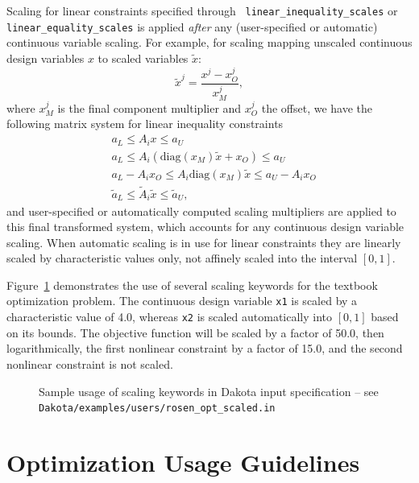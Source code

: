 Scaling for linear constraints specified through {\tt
linear\_inequality\_scales} or {\tt linear\_equality\_scales} is
applied {\em after} any (user-specified or automatic) continuous
variable scaling. For example, for scaling mapping unscaled
continuous design variables $x$ to scaled variables $\tilde{x}$:
\[ \tilde{x}^j = \frac{x^j - x^j_O}{x^j_M}, \]
where $x^j_M$ is the final component multiplier and $x^j_O$ the
offset, we have the following matrix system for linear inequality
constraints
\begin{eqnarray*}
& a_L \leq A_i x \leq a_U \\
& a_L \leq A_i \left( \mathrm{diag}(x_M) \tilde{x} + x_O \right) \leq a_U \\
& a_L - A_i x_O \leq A_i \mathrm{diag}(x_M) \tilde{x} \leq a_U - A_i x_O \\
& \tilde{a}_L \leq \tilde{A}_i \tilde{x} \leq \tilde{a}_U,
\end{eqnarray*}
and user-specified or automatically computed scaling multipliers are
applied to this final transformed system, which accounts for any
continuous design variable scaling. When automatic scaling is in use
for linear constraints they are linearly scaled by characteristic
values only, not affinely scaled into the interval $[0,1]$.

Figure~\ref{opt:additional:scaling:figure01} demonstrates the use of
several scaling keywords for the textbook optimization problem.
The continuous design variable {\tt x1} is scaled by a characteristic
value of 4.0, whereas {\tt x2} is scaled automatically into $[0,1]$
based on its bounds. The objective function will be scaled by a
factor of 50.0, then logarithmically, the first nonlinear constraint
by a factor of 15.0, and the second nonlinear constraint is not
scaled.

\begin{figure}
\centering
\begin{bigbox}
\begin{small}
\end{small}
\end{bigbox}
\caption{Sample usage of scaling keywords in Dakota input specification --
see \texttt{Dakota/examples/users/rosen\_opt\_scaled.in} }
\label{opt:additional:scaling:figure01}
\end{figure}


\section{Optimization Usage Guidelines}\label{opt:usage}

